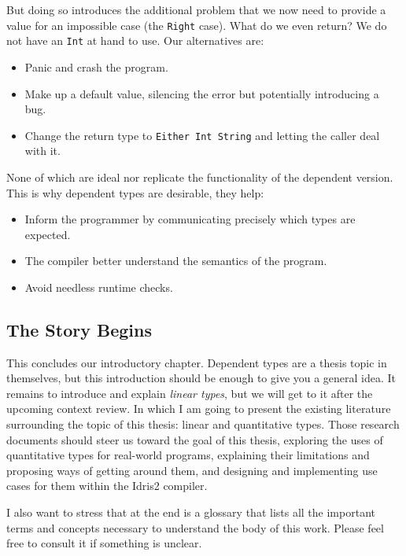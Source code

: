 \documentclass[
]{article}
\providecommand{\tightlist}{%
  \setlength{\itemsep}{0pt}\setlength{\parskip}{0pt}}
\begin{document}
But doing so introduces the additional problem that we now need to
provide a value for an impossible case (the \texttt{Right} case). What
do we even return? We do not have an \texttt{Int} at hand to use. Our
alternatives are:

\begin{itemize}
\tightlist
\item
  Panic and crash the program.
\item
  Make up a default value, silencing the error but potentially
  introducing a bug.
\item
  Change the return type to \texttt{Either\ Int\ String} and letting the
  caller deal with it.
\end{itemize}

None of which are ideal nor replicate the functionality of the dependent
version. This is why dependent types are desirable, they help:

\begin{itemize}
\tightlist
\item
  Inform the programmer by communicating precisely which types are
  expected.
\item
  The compiler better understand the semantics of the program.
\item
  Avoid needless runtime checks.
\end{itemize}

\hypertarget{the-story-begins}{%
\subsection{The Story Begins}\label{the-story-begins}}

This concludes our introductory chapter. Dependent types are a thesis
topic in themselves, but this introduction should be enough to give you
a general idea. It remains to introduce and explain \emph{linear types},
but we will get to it after the upcoming context review. In which I am
going to present the existing literature surrounding the topic of this
thesis: linear and quantitative types. Those research documents should
steer us toward the goal of this thesis, exploring the uses of
quantitative types for real-world programs, explaining their limitations
and proposing ways of getting around them, and designing and
implementing use cases for them within the Idris2 compiler.

I also want to stress that at the end is a glossary that lists all the
important terms and concepts necessary to understand the body of this
work. Please feel free to consult it if something is unclear.
\end{document}
